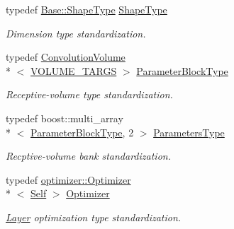 \begin{DoxyCompactItemize}
typedef \hyperlink{classffnn_1_1layer_1_1internal_1_1_interface_a945709b1d0ea54a51539b80d04485f5f}{Base\-::\-Shape\-Type} \hyperlink{classffnn_1_1layer_1_1_local_convolution_a2f1b1364ef9d3eefc517184e2cd1115b}{Shape\-Type}
\begin{DoxyCompactList}\small\item\em Dimension type standardization. \end{DoxyCompactList}\item 
typedef \hyperlink{classffnn_1_1layer_1_1_convolution_volume}{Convolution\-Volume}\\*
$<$ \hyperlink{local__convolution_8h_a3f78e953733a2dba7219b13336105c26}{V\-O\-L\-U\-M\-E\-\_\-\-T\-A\-R\-G\-S} $>$ \hyperlink{classffnn_1_1layer_1_1_local_convolution_ab24fb486de20440b5e67853b079dbab2}{Parameter\-Block\-Type}
\begin{DoxyCompactList}\small\item\em Receptive-\/volume type standardization. \end{DoxyCompactList}\item 
typedef boost\-::multi\-\_\-array\\*
$<$ \hyperlink{classffnn_1_1layer_1_1_local_convolution_ab24fb486de20440b5e67853b079dbab2}{Parameter\-Block\-Type}, 2 $>$ \hyperlink{classffnn_1_1layer_1_1_local_convolution_a09a482b44ecab19df4547526fb9b8321}{Parameters\-Type}
\begin{DoxyCompactList}\small\item\em Recptive-\/volume bank standardization. \end{DoxyCompactList}\item 
typedef \hyperlink{classffnn_1_1optimizer_1_1_optimizer}{optimizer\-::\-Optimizer}\\*
$<$ \hyperlink{classffnn_1_1layer_1_1_layer_a1d461b24632a849b2c26a5051a9cdbeb}{Self} $>$ \hyperlink{classffnn_1_1layer_1_1_local_convolution_afb859216bf8b2f6510bbb5606d15773b}{Optimizer}
\begin{DoxyCompactList}\small\item\em \hyperlink{classffnn_1_1layer_1_1_layer}{Layer} optimization type standardization. \end{DoxyCompactList}\end{DoxyCompactItemize}
